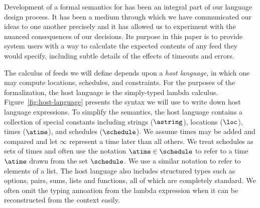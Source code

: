 Development of a formal semantics for \padsd{} has been an integral
part of our language design process.  It has been a medium through
which we have communicated our ideas to one another precisely and it has 
allowed us to experiment with the nuanced consequences of our decisions.
Its purpose in this paper is to
provide system users with a way to calculate the expected contents of
any feed they would specify, including subtle details of the effects
of timeouts and errors.

The calculus of feeds we will define depends upon a {\em
host language}, in which one may compute locations, schedules,
and constraints.  For the purposes of the
formalization, the host language is the simply-typed lambda calculus.
Figure~\ref{fig:host-language} presents the syntax we will use to
write down host language expressions.  To simplify the semantics,
the host language contains a collection of special constants 
including strings ($\astring$), locations ($\loc$), times ($\atime$),
and schedules ($\schedule$).  We assume times may be added and compared
and let $\infty$ represent a time later than all others.
We treat schedules as sets of times and
often use the notation $\atime \in \schedule$ to refer to a time $\atime$
drawn from the set $\schedule$.  We use a similar notation to refer to elements of a list.
The host language also includes structured types
such as options, pairs, sums, lists and functions, all of which are 
completely standard.  We often omit the typing annoation from the lambda
expression when it can be reconstructed from the context easily.

